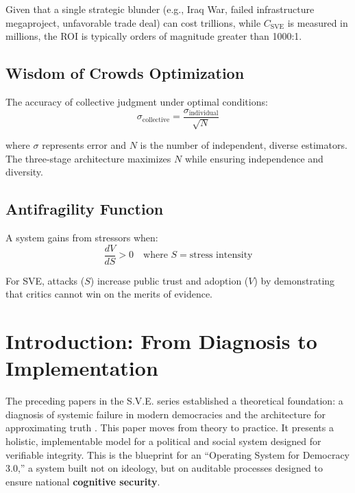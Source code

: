 \documentclass[11pt,a4paper]{article}
\begin{document}
\begin{small}
\noindent Given that a single strategic blunder (e.g., Iraq War, failed infrastructure megaproject, unfavorable trade deal) can cost trillions, while $C_{\text{SVE}}$ is measured in millions, the ROI is typically orders of magnitude greater than 1000:1.

\subsection*{Wisdom of Crowds Optimization}
The accuracy of collective judgment under optimal conditions:
\begin{equation}
\sigma_{\text{collective}} = \frac{\sigma_{\text{individual}}}{\sqrt{N}}
\label{eq:wisdom}
\end{equation}

where $\sigma$ represents error and $N$ is the number of independent, diverse estimators. The three-stage architecture maximizes $N$ while ensuring independence and diversity.

\subsection*{Antifragility Function}
A system gains from stressors when:
\begin{equation}
\frac{dV}{dS} > 0 \quad \text{where } S = \text{stress intensity}
\label{eq:antifragile}
\end{equation}

\noindent For SVE, attacks ($S$) increase public trust and adoption ($V$) by demonstrating that critics cannot win on the merits of evidence.

\vspace{0.5cm}
\clearpage
\setcounter{page}{1}

\section{Introduction: From Diagnosis to Implementation}
The preceding papers in the S.V.E. series established a theoretical foundation: a diagnosis of systemic failure in modern democracies \citep{Kovnatsky2025SVE1} and the architecture for approximating truth \citep{Kovnatsky2025SVE2}. This paper moves from theory to practice. It presents a holistic, implementable model for a political and social system designed for verifiable integrity. This is the blueprint for an ``Operating System for Democracy 3.0,'' a system built not on ideology, but on auditable processes designed to ensure national \textbf{cognitive security}.


\end{small}
\end{document}
